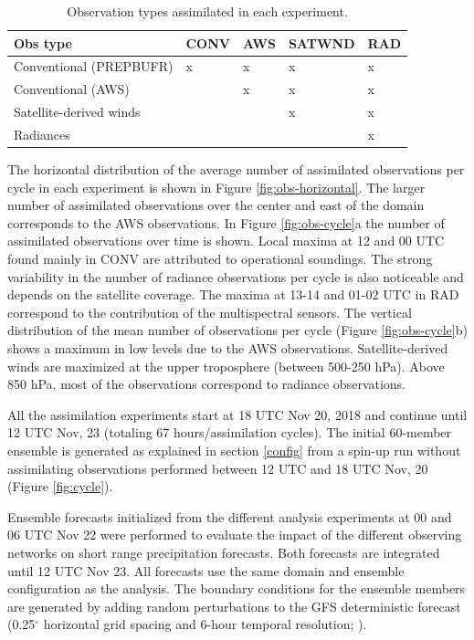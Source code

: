 \documentclass[final,5p,times,twocolumn,authoryear]{elsarticle} %
\begin{document}
\begin{table}

\caption{\label{tab:table-exp}Observation types assimilated in each experiment.}
\centering
\begin{tabu} to 
\toprule
Obs type & CONV & AWS & SATWND & RAD\\
\midrule
Conventional (PREPBUFR) & x & x & x & x\\
Conventional (AWS) &  & x & x & x\\
Satellite-derived winds &  &  & x & x\\
Radiances &  &  &  & x\\
\bottomrule
\end{tabu}
\end{table}

The horizontal distribution of the average number of assimilated observations per cycle in each experiment is shown in Figure \ref{fig:obs-horizontal}. The larger number of assimilated observations over the center and east of the domain corresponds to the AWS observations. In Figure \ref{fig:obs-cycle}a the number of assimilated observations over time is shown. Local maxima at 12 and 00 UTC found mainly in CONV are attributed to operational soundings. The strong variability in the number of radiance observations per cycle is also noticeable and depends on the satellite coverage. The maxima at 13-14 and 01-02 UTC in RAD correspond to the contribution of the multispectral sensors. The vertical distribution of the mean number of observations per cycle (Figure \ref{fig:obs-cycle}b) shows a maximum in low levels due to the AWS observations. Satellite-derived winds are maximized at the upper troposphere (between 500-250 hPa). Above 850 hPa, most of the observations correspond to radiance observations.

All the assimilation experiments start at 18 UTC Nov 20, 2018 and continue until 12 UTC Nov, 23 (totaling 67 hours/assimilation cycles). The initial 60-member ensemble is generated as explained in section \ref{config} from a spin-up run without assimilating observations performed between 12 UTC and 18 UTC Nov, 20 (Figure \ref{fig:cycle}).

Ensemble forecasts initialized from the different analysis experiments at 00 and 06 UTC Nov 22 were performed to evaluate the impact of the different observing networks on short range precipitation forecasts. Both forecasts are integrated until 12 UTC Nov 23. All forecasts use the same domain and ensemble configuration as the analysis. The boundary conditions for the ensemble members are generated by adding random perturbations to the GFS deterministic forecast (0.25\(^{\circ}\) horizontal grid spacing and 6-hour temporal resolution; \citet{cisl_rda_ds084.1}).
\end{document}
